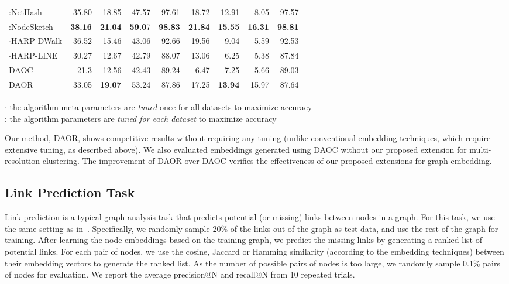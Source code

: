 \documentclass[conference]{IEEEtran}
\newcommand{\sys}{DAOR\xspace}
\begin{document}
\begin{table*}[t]
\begin{tabular}{l|rrrr|rrrr}
:NetHash                  & 35.80          & 18.85          & 47.57          & 97.61          & 18.72          & 12.91          & 8.05           & 97.57          \\
:NodeSketch               & \textbf{38.16} & \textbf{21.04} & \textbf{59.0}7          & \textbf{98.83} & \textbf{21.84} & \textbf{15.55} & \textbf{16.31}          & \textbf{98.81} \\ \hline
$\cdot$HARP-DWalk               & 36.52 & 15.46 & 43.06         & 92.66 & 19.56 & 9.04 & 5.59          & 92.53 \\
$\cdot$HARP-LINE               & 30.27 & 12.67 & 42.79         & 88.07 & 13.06 & 6.25 & 5.38          & 87.84 \\ \hline
DAOC               & 21.3 & 12.56 & 42.43 & 89.24          & 6.47 & 7.25 & 5.66          & 89.03 \\
DAOR               & 33.05 & \textbf{19.07} & 53.24         & 87.86 & 17.25 & \textbf{13.94} & 15.97          & 87.64 \\
\hline
\end{tabular}
\begin{flushleft}
\center
\footnotesize{
$\cdot$  the algorithm meta parameters are \emph{tuned} once for all datasets to maximize accuracy\\
:  the algorithm parameters are \emph{tuned for each dataset} to maximize accuracy
}
\end{flushleft}
\vspace{-4pt}
\end{table*}
Our method, \sys, shows competitive
results without requiring 
any tuning (unlike conventional embedding techniques, which require extensive tuning, as described above).
We also evaluated embeddings generated using DAOC without our proposed extension for multi-resolution clustering. The improvement of DAOR over DAOC verifies the effectiveness of our proposed extensions for graph embedding.  


\subsection{Link Prediction Task}

Link prediction is a typical graph analysis task that predicts potential (or missing) links between nodes in a graph. For this task, we use the same setting as in~\cite{Ou16}. Specifically, we randomly sample 20\% of the links out of the graph as test data, and use the rest of the graph for training. After learning the node embeddings based on the training graph, we predict the missing links by generating a ranked list of potential links. For each pair of nodes, we use the cosine, Jaccard or Hamming similarity (according to the embedding techniques) between their embedding vectors to generate the ranked list. As the number of possible pairs of nodes is too large, we randomly sample 0.1\% pairs of nodes for evaluation. We report the average precision@N and recall@N from 10 repeated trials.
\end{document}
